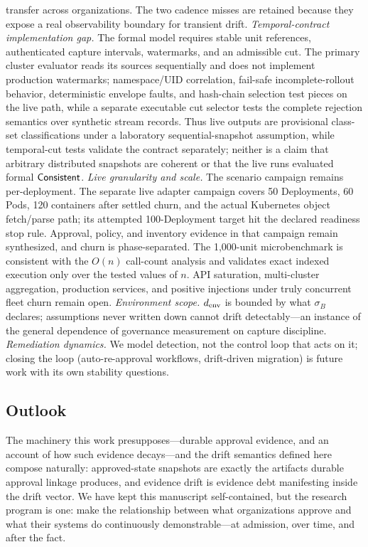 transfer across organizations. The two cadence misses are retained because they expose a
real observability boundary for transient drift.
\emph{Temporal-contract implementation gap.} The formal model requires
stable unit references, authenticated capture intervals, watermarks, and an
admissible cut. The primary cluster evaluator reads its sources sequentially
and does not implement production watermarks; namespace/UID correlation,
fail-safe incomplete-rollout behavior, deterministic envelope faults, and
hash-chain selection test pieces on the live path, while a separate executable
cut selector tests the complete rejection semantics over synthetic stream
records. Thus live outputs are provisional class-set classifications under a
laboratory sequential-snapshot assumption, while temporal-cut tests validate
the contract separately; neither is a claim that arbitrary distributed
snapshots are coherent or that the live runs evaluated formal $\mathsf{Consistent}$.
\emph{Live granularity and scale.} The scenario campaign remains
per-deployment. The separate live adapter campaign covers 50 Deployments,
60 Pods, 120 containers after settled churn, and the actual Kubernetes object
fetch/parse path; its attempted 100-Deployment target hit the declared
readiness stop rule. Approval, policy, and inventory evidence in that campaign
remain synthesized, and churn is phase-separated. The 1,000-unit
microbenchmark is consistent with the $O(n)$ call-count analysis and validates
exact indexed execution only over the tested values of $n$. API saturation,
multi-cluster aggregation, production services, and positive injections under
truly concurrent fleet churn remain open.
\emph{Environment scope.} $d_{\mathrm{env}}$ is bounded
by what $\sigma_B$ declares; assumptions never written down cannot drift
detectably---an instance of the general dependence of governance measurement
on capture discipline. \emph{Remediation dynamics.} We model detection, not
the control loop that acts on it; closing the loop (auto-re-approval
workflows, drift-driven migration) is future work with its own stability
questions.

\subsection{Outlook}
The machinery this work presupposes---durable approval evidence, and an
account of how such evidence decays---and the drift semantics defined here
compose naturally: approved-state snapshots are exactly the
artifacts durable approval linkage produces, and evidence drift is evidence
debt manifesting inside the drift vector. We have kept this manuscript
self-contained, but the research program is one: make the relationship
between what organizations approve and what their systems do continuously
demonstrable---at admission, over time, and after the fact.
